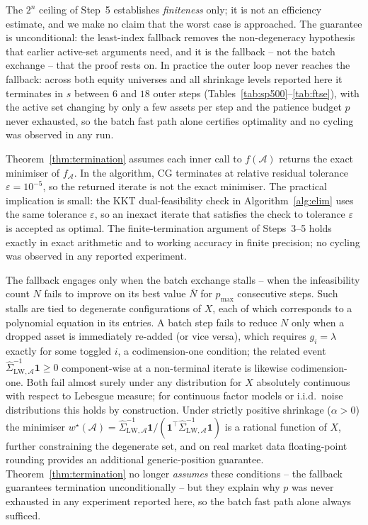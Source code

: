 The $2^n$ ceiling of Step~5 establishes \emph{finiteness} only; it is not an
efficiency estimate, and we make no claim that the worst case is approached. The
guarantee is unconditional: the least-index fallback removes the non-degeneracy
hypothesis that earlier active-set arguments need, and it is the fallback -- not the
batch exchange -- that the proof rests on. In practice the outer loop never reaches
the fallback: across both equity universes and all shrinkage levels reported here it
terminates in $s$ between $6$ and $18$ outer steps
(Tables~\ref{tab:sp500}--\ref{tab:ftse}), with the active set changing by only a few
assets per step and the patience budget $p$ never exhausted, so the batch fast path
alone certifies optimality and no cycling was observed in any run.

\begin{remark}\label{rem:exact}
Theorem~\ref{thm:termination} assumes each inner call to $f(\mathcal{A})$ returns the
exact minimiser of $f_{\mathcal{A}}$.
In the algorithm, CG terminates at relative residual tolerance $\varepsilon = 10^{-5}$,
so the returned iterate is not the exact minimiser.
The practical implication is small: the KKT dual-feasibility check in
Algorithm~\ref{alg:elim} uses the same tolerance $\varepsilon$, so an inexact iterate
that satisfies the check to tolerance $\varepsilon$ is accepted as optimal.
The finite-termination argument of Steps~3--5 holds exactly in exact arithmetic and
to working accuracy in finite precision; no cycling was observed in any reported experiment.
\end{remark}

\begin{remark}\label{rem:nondeg}
The fallback engages only when the batch exchange stalls -- when the infeasibility
count $N$ fails to improve on its best value $\bar N$ for $p_{\max}$ consecutive
steps. Such stalls are tied to degenerate configurations of $X$, each of which
corresponds to a polynomial equation in its entries. A batch step fails to reduce
$N$ only when a dropped asset is immediately re-added (or vice versa), which requires
$g_i = \lambda$ exactly for some toggled $i$, a codimension-one condition; the related
event $\hat\Sigma_{\mathrm{LW},\mathcal{A}}^{-1}\mathbf{1} \geq 0$ component-wise at a
non-terminal iterate is likewise codimension-one. Both fail almost surely under any
distribution for $X$ absolutely continuous with respect to Lebesgue measure; for
continuous factor models or i.i.d.\ noise distributions this holds by construction.
Under strictly positive shrinkage ($\alpha > 0$) the minimiser
$w^\star(\mathcal{A}) = \hat\Sigma_{\mathrm{LW},\mathcal{A}}^{-1}\mathbf{1} /
(\mathbf{1}^\top \hat\Sigma_{\mathrm{LW},\mathcal{A}}^{-1}\mathbf{1})$
is a rational function of $X$, further constraining the degenerate set, and on real
market data floating-point rounding provides an additional generic-position guarantee.
Theorem~\ref{thm:termination} no longer \emph{assumes} these conditions -- the
fallback guarantees termination unconditionally -- but they explain why $p$ was never
exhausted in any experiment reported here, so the batch fast path alone always
sufficed.
\end{remark}

